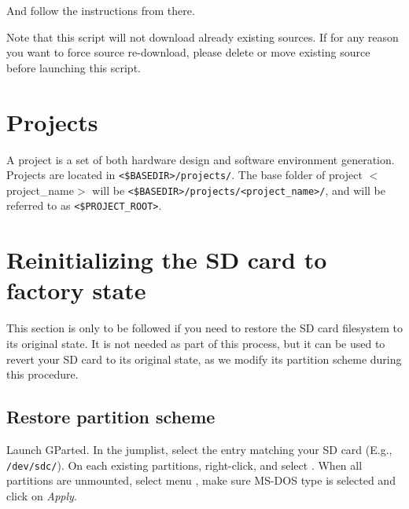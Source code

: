 \documentclass[openany,a4paper]{book}
\begin{document}
And follow the instructions from there.

Note that this script will not download already existing sources.
If for any reason you want to force source re-download, please delete or move existing source before launching this script.


\section{Projects}

A project is a set of both hardware design and software environment generation.
Projects are located in \nolinkurl{<$BASEDIR>/projects/}.
The base folder of project $<$project\_name$>$ will be \nolinkurl{<$BASEDIR>/projects/<project_name>/}, and will be referred to as \nolinkurl{<$PROJECT_ROOT>}.






\section{Reinitializing the SD card to factory state}

This section is only to be followed if you need to restore the SD card filesystem to its original state.
It is not needed as part of this process, but it can be used to revert your SD card to its original state, as we modify its partition scheme during this procedure.

\subsection{Restore partition scheme}

Launch GParted.
In the jumplist, select the entry matching your SD card (E.g., \nolinkurl{/dev/sdc/}).
On each existing partitions, right-click, and select .
When all partitions are unmounted, select menu , make sure MS-DOS type is selected and click on \textit{Apply}.
\end{document}
